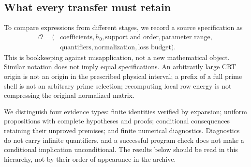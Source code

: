 \subsection{What every transfer must retain}
To compare expressions from different stages, we record a source specification as
\[
\begin{split}
\mathcal O=(&\text{coefficients},h_0,\text{support and order},\text{parameter range},\\
&\text{quantifiers},\text{normalization},\text{loss budget}).
\end{split}
\]
This is bookkeeping against misapplication, not a new mathematical object. Similar notation does not imply equal specifications. An arbitrarily large CRT origin is not an origin in the prescribed physical interval; a prefix of a full prime shell is not an arbitrary prime selection; recomputing local row energy is not compressing the original normalized matrix.

We distinguish four evidence types: finite identities verified by expansion; uniform propositions with complete hypotheses and proofs; conditional consequences retaining their unproved premises; and finite numerical diagnostics. Diagnostics do not carry infinite quantifiers, and a successful program check does not make a conditional implication unconditional. The results below should be read in this hierarchy, not by their order of appearance in the archive.
